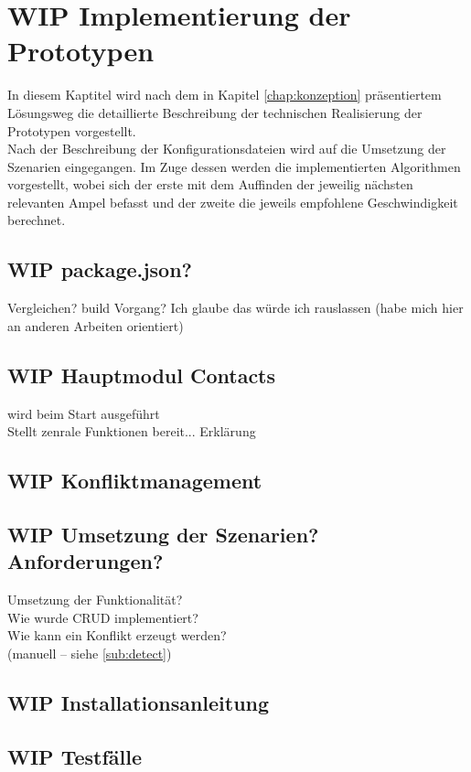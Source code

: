 \chapter{\label{chap:implementierung}WIP Implementierung der Prototypen}
In diesem Kaptitel wird nach dem in Kapitel \ref{chap:konzeption} präsentiertem Lösungsweg die detaillierte Beschreibung der technischen Realisierung der Prototypen vorgestellt.\\
Nach der Beschreibung der Konfigurationsdateien wird auf die Umsetzung der Szenarien eingegangen. Im Zuge dessen werden die implementierten Algorithmen vorgestellt, wobei sich der erste mit dem Auffinden der jeweilig nächsten relevanten Ampel befasst und der zweite die jeweils empfohlene Geschwindigkeit berechnet.
%
%
%
\section{WIP package.json?}
Vergleichen? build Vorgang? Ich glaube das würde ich rauslassen (habe mich hier an anderen Arbeiten orientiert)
%
%
%
\section{WIP Hauptmodul Contacts}
wird beim Start ausgeführt\\
Stellt zenrale Funktionen bereit... Erklärung\\
%
%
%
\section{WIP Konfliktmanagement}
%
%
%
\section{WIP Umsetzung der Szenarien? Anforderungen?}
Umsetzung der Funktionalität? \\
Wie wurde CRUD implementiert?\\
Wie kann ein Konflikt erzeugt werden?\\
(manuell -- siehe \ref{sub:detect})
%
%
\section{WIP Installationsanleitung}


%
%
\section{\label{chap:impl:test}WIP Testfälle}
